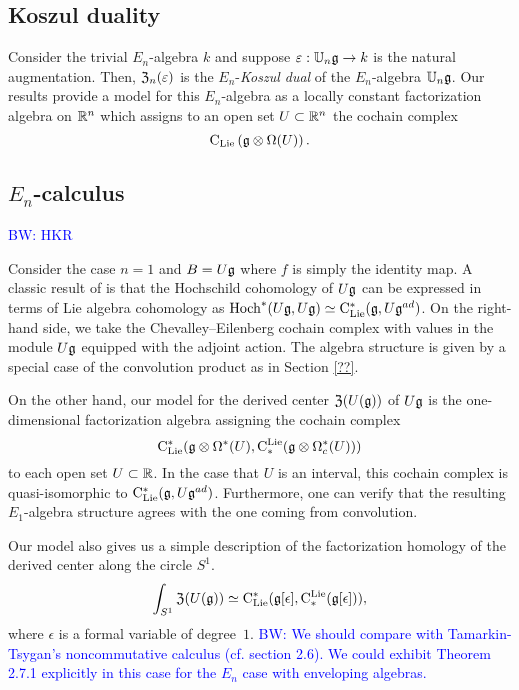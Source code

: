 \documentclass[11pt]{amsart}
\numberwithin{equation}{section}
\def\brian{\textcolor{blue}{BW: }\textcolor{blue}}
\begin{document}
\subsection{Koszul duality}
\label{sec: Koszul}

Consider the trivial $E_n$-algebra $k$ and suppose $\varepsilon : \mathbb U_n \mathfrak g \to k$ is the natural augmentation. 
Then, ${\frak Z}_n (\varepsilon)$ is the $E_n$-{\em Koszul dual} of the $E_n$-algebra $\mathbb U_n \mathfrak g$. 
Our results provide a model for this $E_n$-algebra as a locally constant factorization algebra on $\mathbb R^n$ which assigns to an open set $U \subset \mathbb R^n$ the cochain complex
\[
{\rm C}_{{\rm Lie}} \left(\mathfrak g \otimes \Omega(U) \right) .
\]

\subsection{$E_n$-calculus}
\label{sec: TT}

\brian{HKR}

Consider the case $n=1$ and $B = U \mathfrak g$ where $f$ is simply the identity map. 
A classic result of \cite{HochSerre} is that the Hochschild cohomology of $U \mathfrak g$ can be expressed in terms of Lie algebra cohomology as ${\rm Hoch}^*(U\mathfrak g,U\mathfrak g) \simeq {\rm C}_{\rm Lie}^*(\mathfrak g, U\mathfrak g^{ad})$. 
On the right-hand side, we take the Chevalley--Eilenberg cochain complex with values in the module $U \mathfrak g$ equipped with the adjoint action.
The algebra structure is given by a special case of the convolution product as in Section \ref{??}. 

On the other hand, our model for the derived center ${\frak Z}(U(\mathfrak g))$ of $U \mathfrak g$ is the one-dimensional factorization algebra assigning the cochain complex
\[
{\rm C}_{\rm Lie}^*(\mathfrak g \otimes \Omega^*(U), {\rm C}^{\rm Lie}_*( \mathfrak g \otimes \Omega^*_c(U)))
\]
to each open set $U \subset \mathbb R$.
In the case that $U$ is an interval, this cochain complex is quasi-isomorphic to ${\rm C}_{\rm Lie}^* (\mathfrak g , U\mathfrak g^{ad})$.
Furthermore, one can verify that the resulting $E_1$-algebra structure agrees with the one coming from convolution. 

Our model also gives us a simple description of the factorization homology of the derived center along the circle $S^1$.
\[
\int_{S^1} {\frak Z}(U(\mathfrak g)) \simeq {\rm C}_{\rm Lie}^*(\mathfrak g[\epsilon], {\rm C}^{\rm Lie}_*( \mathfrak g[\epsilon])),
\]
where $\epsilon$ is a formal variable of degree~$1$. 
\brian{We should compare with Tamarkin-Tsygan's noncommutative calculus (cf. section 2.6).
We could exhibit Theorem 2.7.1 explicitly in this case for the $E_n$ case with enveloping algebras.}
\end{document}
